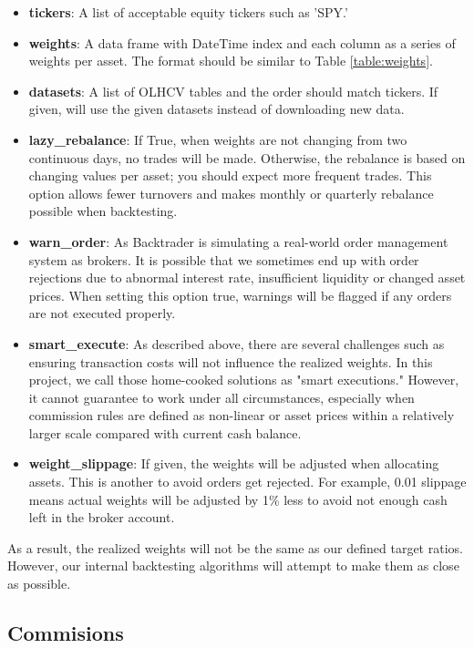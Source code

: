 \documentclass[12pt]{article}
\begin{document}
\begin{itemize}
    \item \textbf{tickers}: A list of acceptable equity tickers such as 'SPY.'
    \item \textbf{weights}: A data frame with DateTime index and each column as a series of weights per asset. The format should be similar to Table \ref{table:weights}.
    \item \textbf{datasets}:  A list of OLHCV tables and the order should match tickers. If given,
    will use the given datasets instead of downloading new data.
    \item \textbf{lazy\_rebalance}:  If True, when weights are not changing from two continuous days, no trades will be made. Otherwise, the rebalance is based on changing values per asset; you should expect more frequent trades. This option allows fewer turnovers and makes monthly or quarterly rebalance possible when backtesting.
    \item \textbf{warn\_order}: As Backtrader is simulating a real-world order management system as brokers. It is possible that we sometimes end up with order rejections due to abnormal interest rate, insufficient liquidity or changed asset prices. When setting this option true, warnings will be flagged if any orders are not executed properly.
    \item \textbf{smart\_execute}: As described above, there are several challenges such as ensuring transaction costs will not influence the realized weights. In this project, we call those home-cooked solutions as "smart executions." However, it cannot guarantee to work under all circumstances, especially when commission rules are defined as non-linear or asset prices within a relatively larger scale compared with current cash balance.
    \item \textbf{weight\_slippage}: If given, the weights will be adjusted when allocating assets. This is another to avoid orders get rejected. For example, 0.01 slippage means actual weights will be adjusted by 1\% less to avoid not enough cash left in the broker account. 
\end{itemize}

As a result, the realized weights will not be the same as our defined target ratios. However, our internal backtesting algorithms will attempt to make them as close as possible.

\subsection{Commisions}
\end{document}

